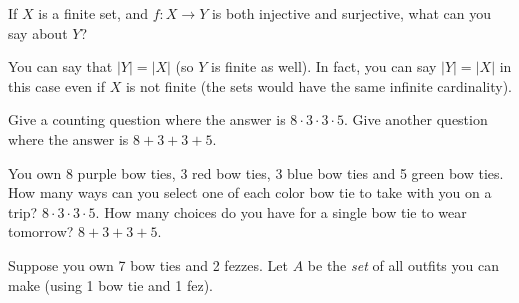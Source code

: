 \begin{questions}
\question If $X$ is a finite set, and $f: X \to Y$ is both injective and surjective, what can you say about $Y$?

	\begin{answer}
		You can say that $|Y| = |X|$ (so $Y$ is finite as well).  In fact, you can say $|Y| = |X|$ in this case even if $X$ is not finite (the sets would have the same infinite cardinality).
	\end{answer}





\question Give a counting question where the answer is $8\cdot 3 \cdot 3 \cdot 5$.  Give another question where the answer is $8 + 3 + 3 + 5$.

	\begin{answer}
		You own 8 purple bow ties, 3 red bow ties, 3 blue bow ties and 5 green bow ties.  How many ways can you select one of each color bow tie to take with you on a trip?  $8 \cdot 3 \cdot 3 \cdot 5$.  How many choices do you have for a single bow tie to wear tomorrow?  $8 + 3 + 3 + 5$.
	\end{answer}



\question Suppose you own 7 bow ties and 2 fezzes.  Let $A$ be the \emph{set} of all outfits you can make (using 1 bow tie and 1 fez).

\begin{answer}
\end{answer}
\end{questions}
